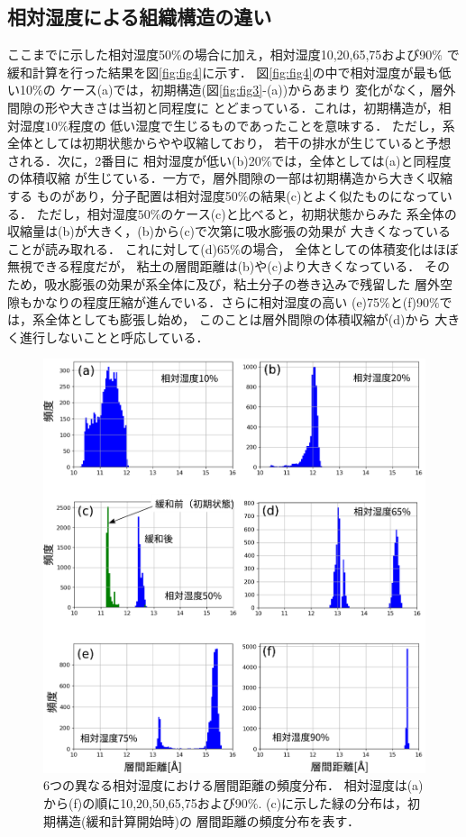 \subsection{相対湿度による組織構造の違い}
ここまでに示した相対湿度50$\%$の場合に加え，相対湿度10,20,65,75および90$\%$
で緩和計算を行った結果を図\ref{fig:fig4}に示す．
図\ref{fig:fig4}の中で相対湿度が最も低い10$\%$の
ケース(a)では，初期構造(図\ref{fig:fig3}-(a))からあまり
変化がなく，層外間隙の形や大きさは当初と同程度に
とどまっている．これは，初期構造が，相対湿度$10\%$程度の
低い湿度で生じるものであったことを意味する．
ただし，系全体としては初期状態からやや収縮しており，
若干の排水が生じていると予想される．次に，2番目に
相対湿度が低い(b)20$\%$では，全体としては(a)と同程度の体積収縮
が生じている．一方で，層外間隙の一部は初期構造から大きく収縮する
ものがあり，分子配置は相対湿度50$\%$の結果(c)とよく似たものになっている．
ただし，相対湿度$50\%$のケース(c)と比べると，初期状態からみた
系全体の収縮量は(b)が大きく，(b)から(c)で次第に吸水膨張の効果が
大きくなっていることが読み取れる．
これに対して(d)65$\%$の場合，
全体としての体積変化はほぼ無視できる程度だが，
粘土の層間距離は(b)や(c)より大きくなっている．
そのため，吸水膨張の効果が系全体に及び，粘土分子の巻き込みで残留した
層外空隙もかなりの程度圧縮が進んでいる．さらに相対湿度の高い
(e)75$\%$と(f)90$\%$では，系全体としても膨張し始め，
このことは層外間隙の体積収縮が(d)から
大きく進行しないことと呼応している．\\
\begin{figure}
	\begin{center}
	\includegraphics[width=1.0\linewidth]{Figs/fig5.pdf} 
	\end{center}
	\caption{
		6つの異なる相対湿度における層間距離の頻度分布．
		相対湿度は(a)から(f)の順に10,20,50,65,75および90$\%$. 
		(c)に示した緑の分布は，初期構造(緩和計算開始時)の
		層間距離の頻度分布を表す．
	} 
	\label{fig:fig5}
\end{figure}
